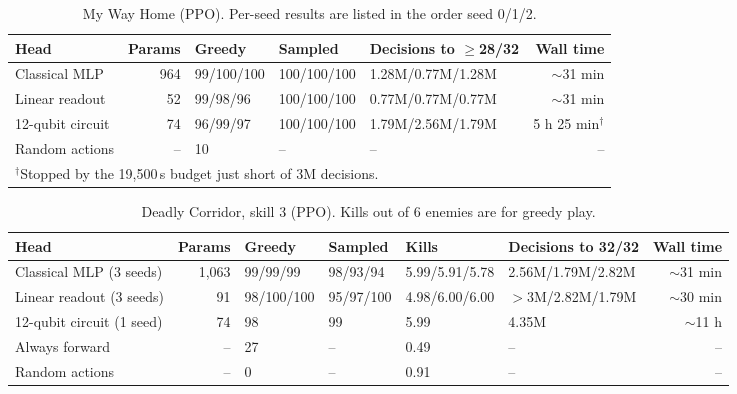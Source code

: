 \documentclass[10pt, a4paper]{article}
\begin{document}
\begin{table}[htbp]
\centering
\footnotesize
\renewcommand{\arraystretch}{1.1}
\caption{My Way Home (PPO). Per-seed results are listed in the order seed 0/1/2.}
\label{tab:mwh}
\begin{tabularx}{\textwidth}{Xrlllr}
\toprule
\textbf{Head} & \textbf{Params} & \textbf{Greedy} & \textbf{Sampled} & \textbf{Decisions to $\geq$28/32} & \textbf{Wall time} \\
\midrule
Classical MLP & 964 & 99/100/100 & 100/100/100 & 1.28M/0.77M/1.28M & $\sim$31 min \\
Linear readout & 52 & 99/98/96 & 100/100/100 & 0.77M/0.77M/0.77M & $\sim$31 min \\
12-qubit circuit & 74 & 96/99/97 & 100/100/100 & 1.79M/2.56M/1.79M & 5 h 25 min$^{\dagger}$ \\
Random actions & -- & 10 & -- & -- & -- \\
\bottomrule
\multicolumn{6}{l}{\scriptsize $^{\dagger}$Stopped by the 19{,}500\,s budget just short of 3M decisions.}
\end{tabularx}
\end{table}

\begin{table}[htbp]
\centering
\footnotesize
\renewcommand{\arraystretch}{1.1}
\caption{Deadly Corridor, skill 3 (PPO). Kills out of 6 enemies are for greedy play.}
\label{tab:corridor}
\begin{tabularx}{\textwidth}{Xrllllr}
\toprule
\textbf{Head} & \textbf{Params} & \textbf{Greedy} & \textbf{Sampled} & \textbf{Kills} & \textbf{Decisions to 32/32} & \textbf{Wall time} \\
\midrule
Classical MLP (3 seeds) & 1,063 & 99/99/99 & 98/93/94 & 5.99/5.91/5.78 & 2.56M/1.79M/2.82M & $\sim$31 min \\
Linear readout (3 seeds) & 91 & 98/100/100 & 95/97/100 & 4.98/6.00/6.00 & $>$3M/2.82M/1.79M & $\sim$30 min \\
12-qubit circuit (1 seed) & 74 & 98 & 99 & 5.99 & 4.35M & $\sim$11 h \\
Always forward & -- & 27 & -- & 0.49 & -- & -- \\
Random actions & -- & 0 & -- & 0.91 & -- & -- \\
\bottomrule
\end{tabularx}
\end{table}
\end{document}
